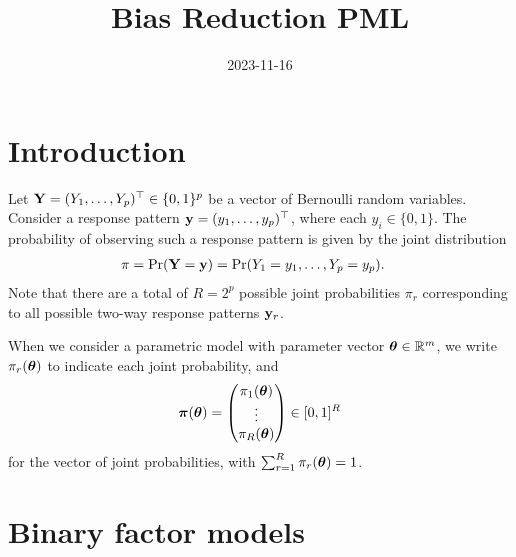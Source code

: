 \documentclass[
]{article}
\title{Bias Reduction PML}
\author{}
\date{\vspace{-2.5em}2023-11-16}
\begin{document}
\maketitle

\newcommand{\pimod}[1]{\pi_{#1}(\btheta)}
\newcommand{\Sigmaystar}{\bSigma_{\by^*}}
\newcommand{\pl}{\operatorname{\ell_P}}
\newcommand{\mlepl}{\hat\btheta_{\text{PL}}}
\newcommand{\mle}{\hat\btheta_{\text{ML}}}
\newcommand{\pimodpl}{\pi_{y_iy_j}^{(ij)}(\btheta)}
\newcommand{\tr}{\operatorname{tr}}

\hypertarget{introduction}{%
\section{Introduction}\label{introduction}}

Let \({\mathbf Y} = (Y_1, \dots, Y_p)^\top \in \{0,1\}^p\) be a vector of
Bernoulli random variables. Consider a response pattern
\({\mathbf y} = (y_1,\dots,y_p)^\top\), where each \(y_i\in\{0,1\}\). The
probability of observing such a response pattern is given by the joint
distribution \begin{align}\label{eq:jointprob1}
\pi
&= \Pr({\mathbf Y} = {\mathbf y})  = \Pr(Y_1=y_1,\dots,Y_p=y_p).
\end{align} Note that there are a total of \(R=2^p\) possible joint
probabilities \(\pi_r\) corresponding to all possible two-way response
patterns \({\mathbf y}_r\).

When we consider a parametric model with parameter vector
\({\boldsymbol\theta}\in\mathbb{R}^m\), we write \(\pi_r({\boldsymbol\theta})\) to indicate each joint
probability, and \begin{equation}\label{eq:jointprob2}
{\boldsymbol\pi}({\boldsymbol\theta}) = \begin{pmatrix}
\pi_{1}({\boldsymbol\theta}) \\
\vdots \\
\pi_{R}({\boldsymbol\theta})  \\
\end{pmatrix} \in [0,1]^R
\end{equation} for the vector of joint probabilities, with
\(\sum_{r=1}^R \pi_{r}({\boldsymbol\theta}) =1\).

\hypertarget{binary-factor-models}{%
\section{Binary factor models}\label{binary-factor-models}}
\end{document}

